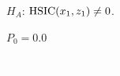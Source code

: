 $H_A$: $\operatorname*{HSIC}(x_1, z_1)\ne0$.

$P_0 = 0.0$
\clearpage

\textcolor{white}{ %
Biblography
}


\ifoot{}%
\clearpage
%

 
